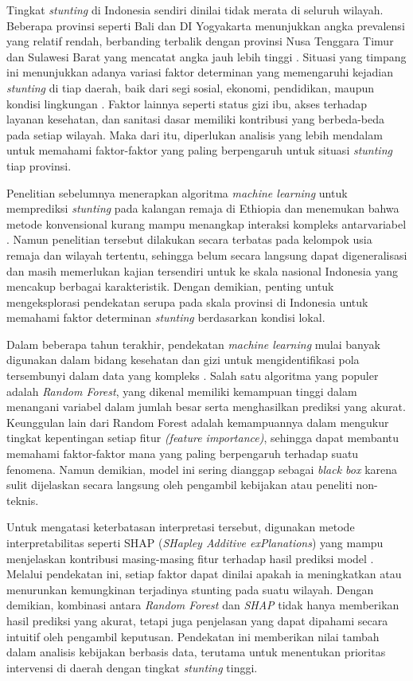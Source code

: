 Tingkat \textit{stunting} di Indonesia sendiri dinilai tidak merata di seluruh wilayah. Beberapa provinsi seperti Bali dan DI Yogyakarta menunjukkan angka prevalensi yang relatif rendah, berbanding terbalik dengan provinsi Nusa Tenggara Timur dan Sulawesi Barat yang mencatat angka jauh lebih tinggi \cite{said2024pencegahan}. Situasi yang timpang ini menunjukkan adanya variasi faktor determinan yang memengaruhi kejadian \textit{stunting} di tiap daerah, baik dari segi sosial, ekonomi, pendidikan, maupun kondisi lingkungan \cite{zemariam2025prediction}. Faktor lainnya seperti status gizi ibu, akses terhadap layanan kesehatan, dan sanitasi dasar memiliki kontribusi yang berbeda-beda pada setiap wilayah. Maka dari itu, diperlukan analisis yang lebih mendalam untuk memahami faktor-faktor yang paling berpengaruh untuk situasi \textit{stunting} tiap provinsi.

Penelitian sebelumnya menerapkan algoritma \textit{machine learning} untuk memprediksi \textit{stunting} pada kalangan remaja di Ethiopia dan menemukan bahwa metode konvensional kurang mampu menangkap interaksi kompleks antarvariabel \cite{zemariam2025prediction}. Namun penelitian tersebut dilakukan secara terbatas pada kelompok usia remaja dan wilayah tertentu, sehingga belum secara langsung dapat digeneralisasi dan masih memerlukan kajian tersendiri untuk ke skala nasional Indonesia yang mencakup berbagai karakteristik. Dengan demikian, penting untuk mengeksplorasi pendekatan serupa pada skala provinsi di Indonesia untuk memahami faktor determinan \textit{stunting} berdasarkan kondisi lokal.

Dalam beberapa tahun terakhir, pendekatan \textit{machine learning} mulai banyak digunakan dalam bidang kesehatan dan gizi untuk mengidentifikasi pola tersembunyi dalam data yang kompleks \cite{tamanna2025identifying}. Salah satu algoritma yang populer adalah \textit{Random Forest}, yang dikenal memiliki kemampuan tinggi dalam menangani variabel dalam jumlah besar serta menghasilkan prediksi yang akurat. Keunggulan lain dari Random Forest adalah kemampuannya dalam mengukur tingkat kepentingan setiap fitur \textit{(feature importance)}, sehingga dapat membantu memahami faktor-faktor mana yang paling berpengaruh terhadap suatu fenomena. Namun demikian, model ini sering dianggap sebagai \textit{black box} karena sulit dijelaskan secara langsung oleh pengambil kebijakan atau peneliti non-teknis.

Untuk mengatasi keterbatasan interpretasi tersebut, digunakan metode interpretabilitas seperti SHAP (\textit{SHapley Additive exPlanations}) yang mampu menjelaskan kontribusi masing-masing fitur terhadap hasil prediksi model \cite{tamanna2025identifying}. Melalui pendekatan ini, setiap faktor dapat dinilai apakah ia meningkatkan atau menurunkan kemungkinan terjadinya stunting pada suatu wilayah. Dengan demikian, kombinasi antara \textit{Random Forest} dan \textit{SHAP} tidak hanya memberikan hasil prediksi yang akurat, tetapi juga penjelasan yang dapat dipahami secara intuitif oleh pengambil keputusan. Pendekatan ini memberikan nilai tambah dalam analisis kebijakan berbasis data, terutama untuk menentukan prioritas intervensi di daerah dengan tingkat \textit{stunting} tinggi.

